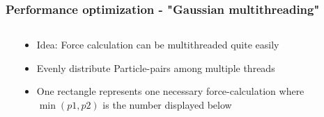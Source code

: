 \begin{frame}
	\frametitle{Performance optimization - "Gaussian multithreading"}
	\vspace{1.5cm}
	\begin{columns}
		\begin{column}{0.48\textwidth}
		\end{column}
		\begin{column}{0.48\textwidth}
	\vspace{-6.5cm}
	\large
	\begin{itemize}
	\item Idea: Force calculation can be multithreaded quite easily 
	\item Evenly distribute Particle-pairs among multiple threads \\
	\item One rectangle represents one necessary force-calculation where $\min(p1,p2)$ is the number displayed below
	\end{itemize}
		\end{column}
	\end{columns}	
\end{frame}

